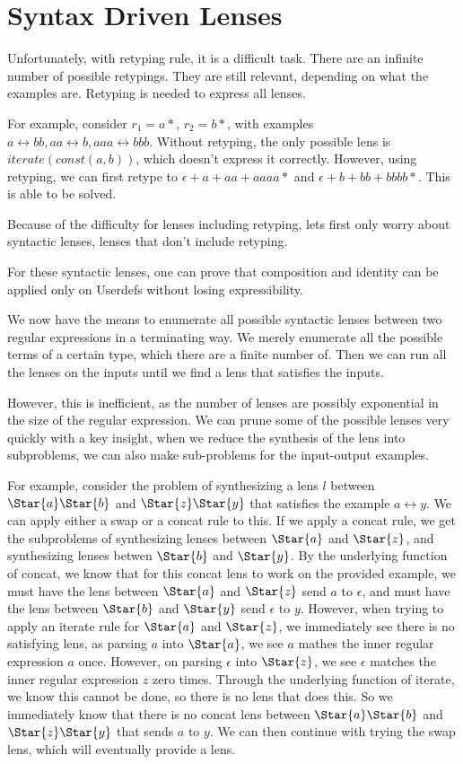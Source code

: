 
\section{Syntax Driven Lenses}
Unfortunately, with retyping rule, it is a difficult task.
There are an infinite number of possible retypings.
They are still relevant, depending on what the examples are.
Retyping is needed to express all lenses.

For example, consider $r_1=a*$, $r_2=b*$, with examples $a \leftrightarrow bb, aa \leftrightarrow b, aaa \leftrightarrow bbb$.
Without retyping, the only possible lens is $iterate(const(a,b))$, which doesn't express it correctly.
However, using retyping, we can first retype to $\epsilon + a + aa + aaaa*$ and $\epsilon + b + bb + bbbb*$.
This is able to be solved.

Because of the difficulty for lenses including retyping, lets first only worry about syntactic lenses, lenses that don't include retyping.


For these syntactic lenses, one can prove that composition and identity can
be applied only on Userdefs without losing expressibility.

We now have the means to enumerate all possible syntactic lenses between two regular
expressions in a terminating way.  We merely enumerate all the possible
terms of a certain type, which there are a finite number of.  Then we can
run all the lenses on the inputs until we find a lens that satisfies the inputs.

However, this is inefficient, as the number of lenses are possibly exponential in the size of the regular expression.  We can prune some of the possible
lenses very quickly with a key insight, when we reduce the synthesis of
the lens into subproblems, we can also make sub-problems for the input-output examples.

For example, consider the problem of synthesizing a lens $l$ between $\Star{a}\Star{b}$ and $\Star{z}\Star{y}$ that satisfies the example $a \leftrightarrow y$.
We can apply either a swap or a concat rule to this.
If we apply a concat rule, we get the subproblems of synthesizing lenses between
$\Star{a}$ and $\Star{z}$, and synthesizing lenses betwen $\Star{b}$ and $\Star{y}$.
By the underlying function of concat, we know that for this concat lens to work on the provided example,
we must have the lens between $\Star{a}$ and $\Star{z}$ send $a$ to $\epsilon$,
and must have the lens between $\Star{b}$ and $\Star{y}$ send $\epsilon$ to $y$.
However, when trying to apply an iterate rule for $\Star{a}$ and $\Star{z}$, we immediately see there is no satisfying lens,
as parsing $a$ into $\Star{a}$, we see $a$ mathes the inner regular expression $a$ once.
However, on parsing $\epsilon$ into $\Star{z}$, we see $\epsilon$ matches the inner regular expression $z$ zero times.
Through the underlying function of iterate, we know this cannot be done,
so there is no lens that does this.
So we immediately know that there is no concat lens between
$\Star{a}\Star{b}$ and $\Star{z}\Star{y}$ that sends $a$ to $y$.
We can then continue with trying the swap lens, which will eventually provide a lens.



